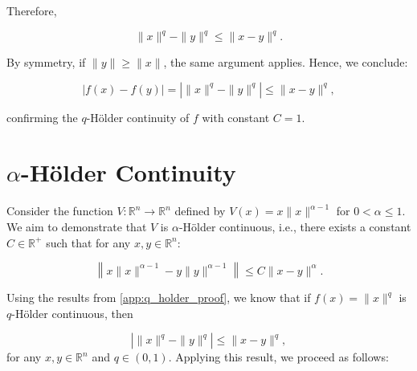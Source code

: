 Therefore,

\begin{equation*}
\| x \|^q - \| y \|^q \leq \| x - y \|^q.
\end{equation*}

By symmetry, if \( \| y \| \geq \| x \| \), the same argument applies. Hence, we conclude:

\begin{equation*}
\left| f(x) - f(y) \right| = \left| \|x\|^q - \|y\|^q \right| \leq \|x - y\|^q,
\end{equation*}

confirming the \( q \)-Hölder continuity of \( f \) with constant \( C = 1 \).



\section{\texorpdfstring{$\alpha$}{alpha}-Hölder Continuity}
\label{app:alpha_holder_proof}

Consider the function \( V : \mathbb{R}^n \rightarrow \mathbb{R}^n \) defined by \( V(x) = x \|x\|^{\alpha - 1} \) for \( 0 < \alpha \leq 1 \). We aim to demonstrate that \( V \) is \( \alpha \)-Hölder continuous, i.e., there exists a constant \( C \in \mathbb{R}^+ \) such that for any \( x, y \in \mathbb{R}^n \):

\begin{equation*}
    \left\| x\|x\|^{\alpha-1} - y\|y\|^{\alpha-1} \right\| \leq C \|x - y\|^{\alpha}.
\end{equation*}

Using the results from \ref{app:q_holder_proof}, we know that if \( f(x) = \|x\|^q \) is \( q \)-Hölder continuous, then

\begin{equation*}
\left| \|x\|^q - \|y\|^q \right| \leq \|x - y\|^q,
\end{equation*}
for any \( x, y \in \mathbb{R}^n \) and \( q \in (0, 1) \). Applying this result, we proceed as follows:

